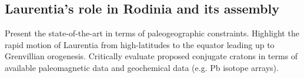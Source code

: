 \documentclass[11pt,letterpaper]{article}
\begin{document}
\subsection*{Laurentia's role in Rodinia and its assembly}
Present the state-of-the-art in terms of paleogeographic constraints. Highlight the rapid motion of Laurentia from high-latitudes to the equator leading up to Grenvillian orogenesis. Critically evaluate proposed conjugate cratons in terms of available paleomagnetic data and geochemical data (e.g. Pb isotope arrays). 
\end{document}
